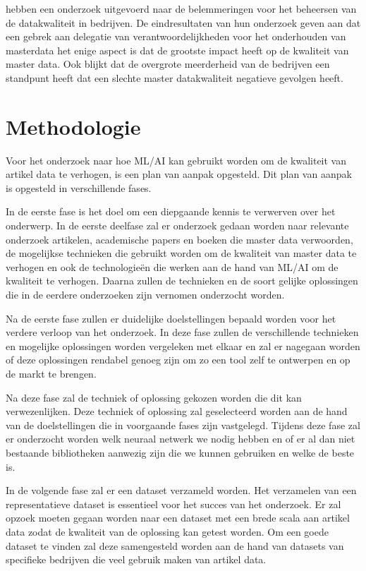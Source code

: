 \textcite{ Haug2011a} hebben een onderzoek uitgevoerd naar de belemmeringen voor het beheersen van de datakwaliteit in bedrijven. De eindresultaten van hun onderzoek geven aan dat een gebrek aan delegatie van verantwoordelijkheden voor het onderhouden van masterdata het enige aspect is dat de grootste impact heeft op de kwaliteit van master data. Ook blijkt dat de overgrote meerderheid van de bedrijven een standpunt heeft dat een slechte master datakwaliteit negatieve gevolgen heeft. 

\section{Methodologie}%
\label{sec:methodologie}

Voor het onderzoek naar hoe ML/AI kan gebruikt worden om de kwaliteit van artikel data te verhogen, is een plan van aanpak opgesteld. Dit plan van aanpak is opgesteld in verschillende fases. 

In de eerste fase is het doel om een diepgaande kennis te verwerven over het onderwerp. In de eerste deelfase zal er onderzoek gedaan worden naar relevante onderzoek artikelen, academische papers en boeken die master data verwoorden, de mogelijkse technieken die gebruikt worden om de kwaliteit van master data te verhogen en ook de technologieën die werken aan de hand van ML/AI om de kwaliteit te verhogen. Daarna zullen de technieken en de soort gelijke oplossingen die in de eerdere onderzoeken zijn vernomen onderzocht worden. 

Na de eerste fase zullen er duidelijke doelstellingen bepaald worden voor het verdere verloop van het onderzoek. In deze fase zullen de verschillende technieken en mogelijke oplossingen worden vergeleken met elkaar en zal er nagegaan worden of deze oplossingen rendabel genoeg zijn om zo een tool zelf te ontwerpen en op de markt te brengen. 

Na deze fase zal de techniek of oplossing gekozen worden die dit kan verwezenlijken. Deze techniek of oplossing zal geselecteerd worden aan de hand van de doelstellingen die in voorgaande fases zijn vastgelegd. Tijdens deze fase zal er onderzocht worden welk neuraal netwerk we nodig hebben en of er al dan niet bestaande bibliotheken aanwezig zijn die we kunnen gebruiken en welke de beste is. 

In de volgende fase zal er een dataset verzameld worden. Het verzamelen van een representatieve dataset is essentieel voor het succes van het onderzoek. Er zal opzoek moeten gegaan worden naar een dataset met een brede scala aan artikel data zodat de kwaliteit van de oplossing kan getest worden. Om een goede dataset te vinden zal deze samengesteld worden aan de hand van datasets van specifieke bedrijven die veel gebruik maken van artikel data.


